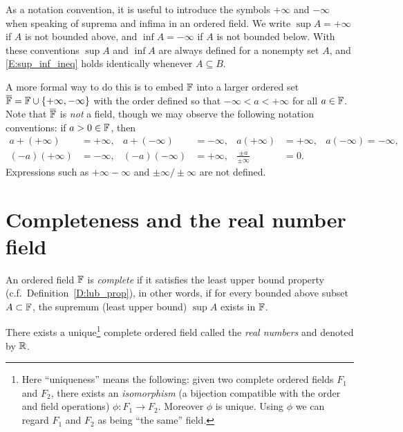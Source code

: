 \documentclass{book}
\begin{document}
\begin{defn}
As a notation convention, it is useful to introduce the symbols $+\infty$ and
$-\infty$ when speaking of suprema and infima in an ordered field. We write
$\sup A = + \infty$ if $A$ is not bounded above, and $\inf A = -\infty$ if $A$
is not bounded below.  With these conventions $\sup A$ and $\inf A$ are always
defined for a nonempty set $A$, and \eqref{E:sup_inf_ineq} holds identically whenever $A \subseteq B$.

A more formal way to do this is to embed $\mathbb{F}$ into a larger ordered set $\overline{\mathbb{F}} = \mathbb{F} \cup \left\{ +\infty,-\infty \right\}$ with the order
defined so that $-\infty < a < + \infty$ for all $a \in \mathbb{F}$. Note that $\overline{\mathbb{F}}$ is {\em not} a field, though we may observe the following notation conventions: if
$a > 0\in \mathbb{F}$, then
\[
\begin{aligned}
	a + (+\infty) &= + \infty, &a + (-\infty) &= -\infty,
	& a(+\infty) &= +\infty, &a(-\infty) = -\infty,
	\\ (-a)(+\infty) &= -\infty, &(-a)(-\infty) &= +\infty,
	& \frac{\pm a}{\pm\infty} &= 0.
\end{aligned}
\]
Expressions such as $+\infty - \infty$ and $\pm\infty/\pm \infty$ are not defined.
\label{D:pm_infty}
\end{defn}


\section{Completeness and the real number field} \label{S:field_complete}
\begin{defn}
An ordered field $\mathbb{F}$ is {\em complete} if it satisfies the least upper bound property (c.f.\ Definition~\ref{D:lub_prop}), in other words,
if for every bounded above subset $A \subset \mathbb{F}$, the supremum (least upper bound) $\sup A$ exists in $\mathbb{F}$.
\label{D:complete_field}
\end{defn}


\begin{thmdag}
There exists a unique\footnote{Here ``uniqueness'' means the following: given two complete ordered fields $F_1$ and $F_2$, there exists an {\em isomorphism} (a bijection compatible with the order and field operations) $\phi : F_1 \to F_2$. Moreover $\phi$ is unique. Using $\phi$ we can regard $F_1$ and $F_2$ as being ``the same'' field.} complete ordered field called the {\em real numbers} and denoted by $\mathbb{R}$.
\label{T:reals}
\end{thmdag}
\end{document}
